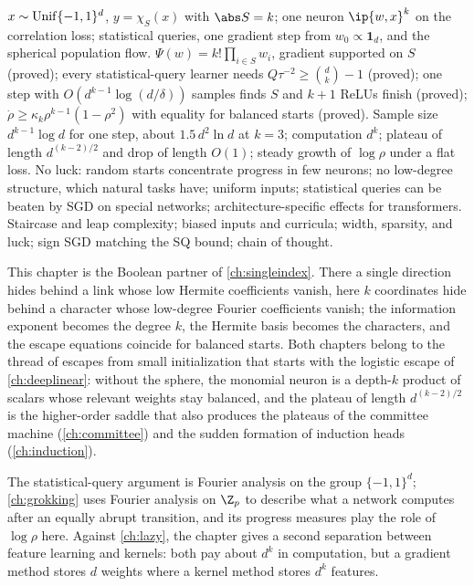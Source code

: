 \begin{refsection}
{$x\sim\operatorname{Unif}\{-1,1\}^d$, $y=\chi_S(x)$ with $\abs S=k$; one neuron $\ip{w,x}^k$ on the correlation loss; statistical queries, one gradient step from $w_0\propto\mathbf 1_d$, and the spherical population flow.}
{$\Psi(w)=k!\prod_{i\in S}w_i$, gradient supported on $S$ (proved); every statistical-query learner needs $Q\tau^{-2}\ge\binom dk-1$ (proved); one step with $O(d^{k-1}\log(d/\delta))$ samples finds $S$ and $k+1$ ReLUs finish (proved); $\dot\rho\ge\kappa_k\rho^{k-1}(1-\rho^2)$ with equality for balanced starts (proved).}
{Sample size $d^{k-1}\log d$ for one step, about $1.5\,d^2\ln d$ at $k=3$; computation $d^k$; plateau of length $d^{(k-2)/2}$ and drop of length $O(1)$; steady growth of $\log\rho$ under a flat loss.}
{No luck: random starts concentrate progress in few neurons; no low-degree structure, which natural tasks have; uniform inputs; statistical queries can be beaten by SGD on special networks; architecture-specific effects for transformers.}
{Staircase and leap complexity; biased inputs and curricula; width, sparsity, and luck; sign SGD matching the SQ bound; chain of thought.}

This chapter is the Boolean partner of \cref{ch:singleindex}. There a single direction hides behind a link whose low Hermite coefficients vanish, here $k$ coordinates hide behind a character whose low-degree Fourier coefficients vanish; the information exponent becomes the degree $k$, the Hermite basis becomes the characters, and the escape equations coincide for balanced starts. Both chapters belong to the thread of escapes from small initialization that starts with the logistic escape of \cref{ch:deeplinear}: without the sphere, the monomial neuron is a depth-$k$ product of scalars whose relevant weights stay balanced, and the plateau of length $d^{(k-2)/2}$ is the higher-order saddle that also produces the plateaus of the committee machine (\cref{ch:committee}) and the sudden formation of induction heads (\cref{ch:induction}).

The statistical-query argument is Fourier analysis on the group $\{-1,1\}^d$; \cref{ch:grokking} uses Fourier analysis on $\Z_p$ to describe what a network computes after an equally abrupt transition, and its progress measures play the role of $\log\rho$ here. Against \cref{ch:lazy}, the chapter gives a second separation between feature learning and kernels: both pay about $d^k$ in computation, but a gradient method stores $d$ weights where a kernel method stores $d^k$ features.


\end{refsection}
